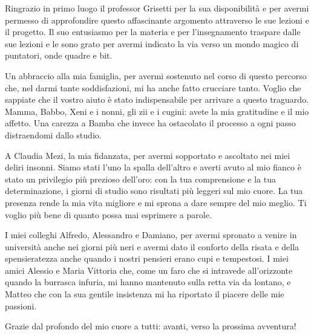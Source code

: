 \documentclass[noexaminfo,oneside]{sapthesis}
\begin{document}
\begin{acknowledgments}
Ringrazio in primo luogo il professor Grisetti per la sua disponibilità e per avermi permesso di approfondire questo affascinante argomento attraverso le sue lezioni e il progetto. Il suo entusiasmo per la materia e per l'insegnamento traspare dalle sue lezioni e le sono grato per avermi indicato la via verso un mondo magico di puntatori, onde quadre e bit.

Un abbraccio alla mia famiglia, per avermi sostenuto nel corso di questo percorso che, nel darmi tante soddisfazioni, mi ha anche fatto crucciare tanto. Voglio che sappiate che il vostro aiuto è stato indispensabile per arrivare a questo traguardo. Mamma, Babbo, Xeni e i nonni, gli zii e i cugini: avete la mia gratitudine e il mio affetto. Una carezza a Bamba che invece ha ostacolato il processo a ogni passo distraendomi dallo studio. 

A Claudia Mezi, la mia fidanzata, per avermi sopportato e ascoltato nei miei deliri insonni. Siamo stati l'uno la spalla dell'altro e averti avuto al mio fianco è stato un privilegio più prezioso dell'oro: con la tua comprensione e la tua determinazione, i giorni di studio sono risultati più leggeri sul mio cuore. La tua presenza rende la mia vita migliore e mi sprona a dare sempre del mio meglio. Ti voglio più bene di quanto possa mai esprimere a parole.

I miei colleghi Alfredo, Alessandro e Damiano, per avermi spronato a venire in università anche nei giorni più neri e avermi dato il conforto della risata e della spensieratezza anche quando i nostri pensieri erano cupi e tempestosi. I miei amici Alessio e Maria Vittoria che, come un faro che si intravede all'orizzonte quando la burrasca infuria, mi hanno mantenuto sulla retta via da lontano, e Matteo che con la sua gentile insistenza mi ha riportato il piacere delle mie passioni. 

Grazie dal profondo del mio cuore a tutti: avanti, verso la prossima avventura!
\end{acknowledgments}
\end{document}
